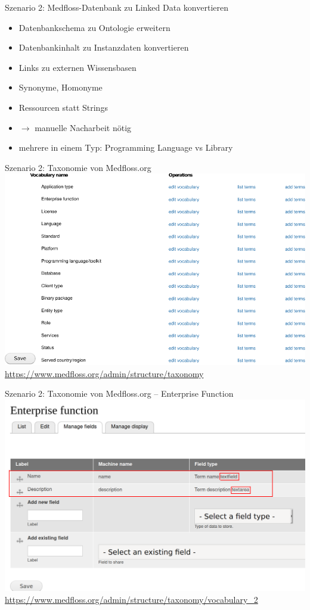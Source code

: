 \documentclass[aspectratio=1610,12pt]{beamer}
\begin{document}
\begin{frame}{Szenario 2: Medfloss-Datenbank zu Linked Data konvertieren}
\begin{spacing}{1.25}
\begin{itemize}
\item Datenbankschema zu Ontologie erweitern
\item Datenbankinhalt zu Instanzdaten konvertieren
\item Links zu externen Wissensbasen
\item Synonyme, Homonyme
\item Ressourcen statt Strings
\item $\rightarrow$ manuelle Nacharbeit nötig
\item mehrere in einem Typ: Programming Language vs Library
\end{itemize}
\end{spacing}
\end{frame}

\begin{frame}{Szenario 2: Taxonomie von Medfloss.org}
\centering
\includegraphics[height=.72\textheight]{img/medfloss-taxonomy.pdf}
\url{https://www.medfloss.org/admin/structure/taxonomy}
\end{frame}

\begin{frame}{Szenario 2: Taxonomie von Medfloss.org -- Enterprise Function}
\centering
\includegraphics[height=.72\textheight]{img/medfloss-function.png}
\url{https://www.medfloss.org/admin/structure/taxonomy/vocabulary_2}
\end{frame}
\end{document}
